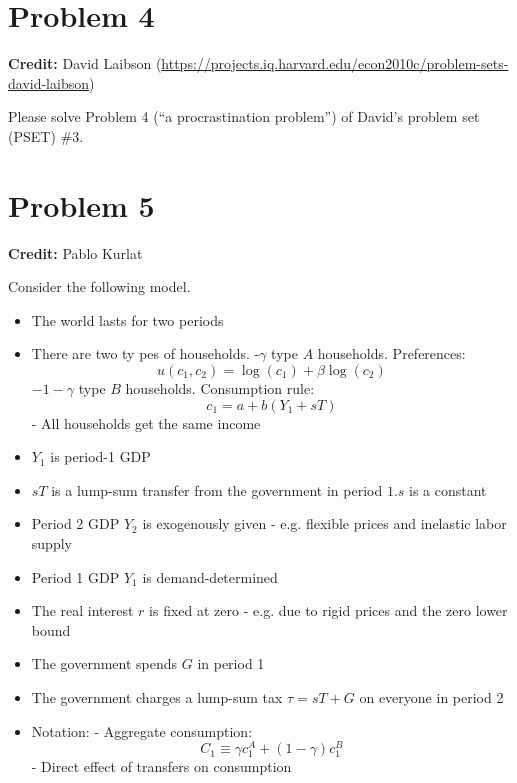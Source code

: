 \documentclass[11pt]{extarticle}
\theoremstyle{plain}
\theoremstyle{definition}
\begin{document}
\section*{Problem 4}

\textbf{Credit:} David Laibson (\url{https://projects.iq.harvard.edu/econ2010c/problem-sets-david-laibson})

Please solve Problem 4 (``a procrastination problem'') of David's problem set (PSET) \#3.





\vspace{10mm}
\section*{Problem 5}

\textbf{Credit:} Pablo Kurlat



Consider the following model.
\begin{itemize}
\item The world lasts for two periods
\item There are two ty pes of households.
-$\gamma$ type $A$ households. Preferences:
$$
u\left(c_1, c_2\right)=\log \left(c_1\right)+\beta \log \left(c_2\right)
$$
$-1-\gamma$ type $B$ households. Consumption rule:
$$
c_1=a+b\left(Y_1+s T\right)
$$
- All households get the same income
\item $Y_1$ is period-1 GDP
\item $s T$ is a lump-sum transfer from the government in period $1 . s$ is a constant
\item Period 2 GDP $Y_2$ is exogenously given
- e.g. flexible prices and inelastic labor supply
\item Period 1 GDP $Y_1$ is demand-determined
\item The real interest $r$ is fixed at zero
- e.g. due to rigid prices and the zero lower bound
\item The government spends $G$ in period 1
\item The government charges a lump-sum tax $\tau=s T+G$ on everyone in period 2
\item Notation:
- Aggregate consumption:
$$
C_1 \equiv \gamma c_1^A+(1-\gamma) c_1^B
$$
- Direct effect of transfers on consumption
\end{itemize}
\end{document}
